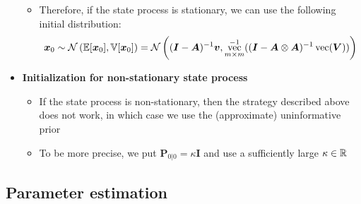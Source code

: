 \documentclass[12pt,a4paper]{article}
\DeclareMathOperator{\vect}{vec}
\begin{document}
\begin{itemize}
\begin{itemize}
  \item Therefore, if the state process is stationary, we can use the
    following initial distribution:
    \begin{equation}\label{eq:bmx0}%
      \bm{x}_{0}
      \sim
      \mathcal{N} \left(\E[\bm{x}_{0}], \V[\bm{x}_{0}]\right)
      =
      \mathcal{N} \left((\bm{I}-\bm{A})^{-1}\bm{v}, \vect_{m\times m}^{-1}((\bm{I} - \bm{A}\otimes \bm{A})^{-1}\vect(\bm{V}))\right)
    \end{equation}

  \end{itemize}

\item \textbf{Initialization for non-stationary state process}

  \begin{itemize}
  \item If the state process is non-stationary, then the strategy
    described above does not work, in which case we use the
    (approximate) uninformative prior

  \item To be more precise, we put $\bm{P}_{0|0}=\kappa \bm{I}$ and use a
    sufficiently large $\kappa\in \mathbb{R}$
  \end{itemize}

\end{itemize}

\clearpage
\subsection{Parameter estimation}
\end{document}
